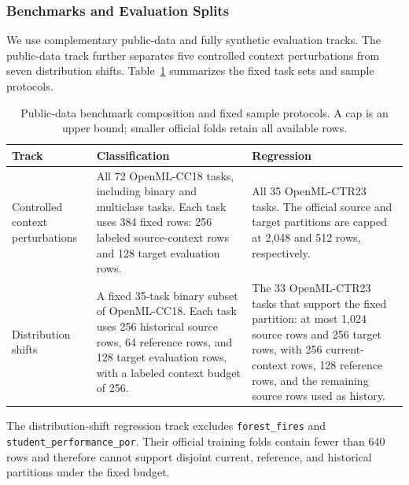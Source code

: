 \subsubsection{Benchmarks and Evaluation Splits}
\label{app:data_splits}

We use complementary public-data and fully synthetic evaluation tracks.  The
public-data track further separates five controlled context perturbations from
seven distribution shifts.  Table~\ref{tab:public-benchmark-protocols}
summarizes the fixed task sets and sample protocols.

\begin{table}[H]
  \caption{Public-data benchmark composition and fixed sample protocols.  A
  cap is an upper bound; smaller official folds retain all available rows.}
  \label{tab:public-benchmark-protocols}
  \centering
  \footnotesize
  \setlength{\tabcolsep}{4pt}
  \begin{tabular}{@{}>{\raggedright\arraybackslash}p{}
                      >{\raggedright\arraybackslash}p{}
                      >{\raggedright\arraybackslash}p{}@{}}
    \toprule
    Track & Classification & Regression \\
    \midrule
    Controlled context perturbations
      & All 72 OpenML-CC18 tasks, including binary and multiclass tasks.  Each
        task uses 384 fixed rows: 256 labeled source-context rows and 128 target
        evaluation rows.
      & All 35 OpenML-CTR23 tasks.  The official source and target partitions
        are capped at 2,048 and 512 rows, respectively. \\
    Distribution shifts
      & A fixed 35-task binary subset of OpenML-CC18.  Each task uses 256
        historical source rows, 64 reference rows, and 128 target evaluation
        rows, with a labeled context budget of 256.
      & The 33 OpenML-CTR23 tasks that support the fixed partition: at most
        1,024 source rows and 256 target rows, with 256 current-context rows,
        128 reference rows, and the remaining source rows used as history. \\
    \bottomrule
  \end{tabular}
\end{table}

The distribution-shift regression track excludes \nolinkurl{forest_fires} and
\nolinkurl{student_performance_por}.  Their official training folds contain
fewer than 640 rows and therefore cannot support disjoint current, reference,
and historical partitions under the fixed budget.

